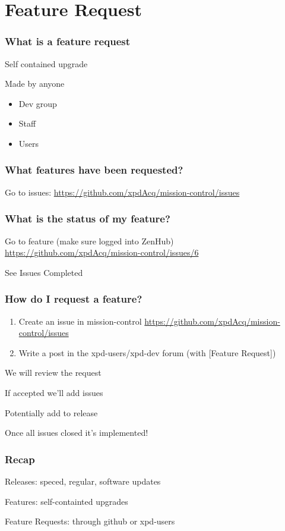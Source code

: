 \documentclass{beamer}
\begin{document}
\section{Feature Request}
\begin{frame}
    \frametitle{What is a feature request}
    Self contained upgrade
    \pause

    Made by anyone
    \begin{itemize}
        \item Dev group
        \item Staff
        \item Users
    \end{itemize}
\end{frame}

\begin{frame}
    \frametitle{What features have been requested?}
    Go to issues: \url{https://github.com/xpdAcq/mission-control/issues}
\end{frame}

\begin{frame}
    \frametitle{What is the status of my feature?}
    Go to feature (make sure logged into ZenHub)
    \url{https://github.com/xpdAcq/mission-control/issues/6}

    See Issues Completed
\end{frame}

\begin{frame}
    \frametitle{How do I request a feature?}
    \begin{enumerate}
        \pause
        \item Create an issue in mission-control
        \url{https://github.com/xpdAcq/mission-control/issues}
        \pause
        \item Write a post in the xpd-users/xpd-dev forum
        (with [Feature Request])
    \end{enumerate}

    \pause
    We will review the request

    \pause
    If accepted we'll add issues

    \pause
    Potentially add to release

    \pause
    Once all issues closed it's implemented!
\end{frame}
\begin{frame}
\frametitle{Recap}
Releases: speced, regular, software updates

Features: self-containted upgrades

Feature Requests: through github or xpd-users
\end{frame}
\end{document}

